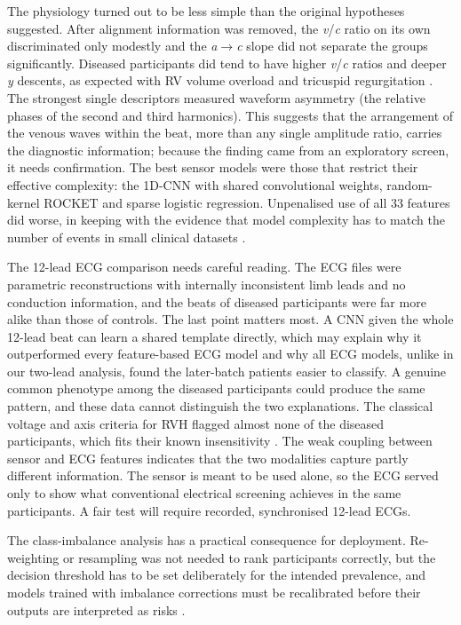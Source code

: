 \documentclass[11pt]{article}
\begin{document}
The physiology turned out to be less simple than the original hypotheses suggested. After alignment information was removed, the \textit{v}/\textit{c} ratio on its own discriminated only modestly and the \textit{a}$\to$\textit{c} slope did not separate the groups significantly. Diseased participants did tend to have higher \textit{v}/\textit{c} ratios and deeper \textit{y} descents, as expected with RV volume overload and tricuspid regurgitation \cite{applefeld1990jugular,devine2007jugular,ranganathan2023jugular}. The strongest single descriptors measured waveform asymmetry (the relative phases of the second and third harmonics). This suggests that the arrangement of the venous waves within the beat, more than any single amplitude ratio, carries the diagnostic information; because the finding came from an exploratory screen, it needs confirmation. The best sensor models were those that restrict their effective complexity: the 1D-CNN with shared convolutional weights, random-kernel ROCKET and sparse logistic regression. Unpenalised use of all 33 features did worse, in keeping with the evidence that model complexity has to match the number of events in small clinical datasets \cite{christodoulou2019systematic,grinsztajn2022why,riley2020calculating}.

The 12-lead ECG comparison needs careful reading. The ECG files were parametric reconstructions with internally inconsistent limb leads and no conduction information, and the beats of diseased participants were far more alike than those of controls. The last point matters most. A CNN given the whole 12-lead beat can learn a shared template directly, which may explain why it outperformed every feature-based ECG model and why all ECG models, unlike in our two-lead analysis, found the later-batch patients easier to classify. A genuine common phenotype among the diseased participants could produce the same pattern, and these data cannot distinguish the two explanations. The classical voltage and axis criteria for RVH flagged almost none of the diseased participants, which fits their known insensitivity \cite{murphy1984reevaluation,lehtonen1988electrocardiographic,whitman2014validity}. The weak coupling between sensor and ECG features indicates that the two modalities capture partly different information. The sensor is meant to be used alone, so the ECG served only to show what conventional electrical screening achieves in the same participants. A fair test will require recorded, synchronised 12-lead ECGs.

The class-imbalance analysis has a practical consequence for deployment. Re-weighting or resampling was not needed to rank participants correctly, but the decision threshold has to be set deliberately for the intended prevalence, and models trained with imbalance corrections must be recalibrated before their outputs are interpreted as risks \cite{vandengoorbergh2022harm}.
\end{document}
